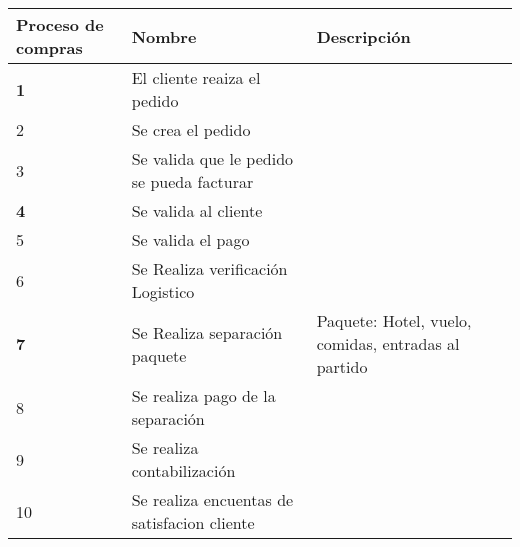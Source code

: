 \begin{table}[H]
\centering
\resizebox{17cm}{!} {
\begin{tabular}{|l|l|l|}
\hline
\textbf{Proceso de compras} & \textbf{Nombre} & \textbf{Descripción} \\ \hline
\textbf{1} & El cliente reaiza el pedido &  \\ \hline
2 & Se crea el pedido &  \\ \hline
3 & Se valida que le pedido se pueda facturar &  \\ \hline
\textbf{4} & Se valida al cliente &  \\ \hline
5 & Se valida el pago &  \\ \hline
6 & Se Realiza verificación Logistico &  \\ \hline
\textbf{7} & Se Realiza separación paquete & Paquete: Hotel, vuelo, comidas, entradas al partido \\ \hline
8 & Se realiza pago de la separación &  \\ \hline
9 & Se realiza contabilización &  \\ \hline
10 & Se realiza encuentas de satisfacion cliente &  \\ \hline
\end{tabular}
}
\end{table}